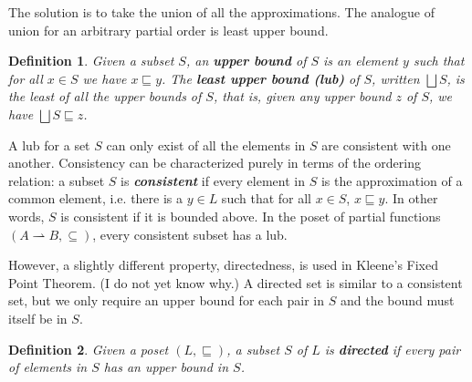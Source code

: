 \documentclass{tufte-handout}
\newtheorem{definition}{Definition}%
\begin{document}
The solution is to take the union of all the approximations. The
analogue of union for an arbitrary partial order is least upper bound.
%
%
\begin{definition}
Given a subset $S$, an \textbf{\emph{upper bound}} of $S$ is an element
$y$ such that for all $x \in S$ we have $x \sqsubseteq y$.  The
\textbf{\emph{least upper bound (lub)}} of $S$, written $\bigsqcup S$,
is the least of all the upper bounds of $S$, that is, given any upper
bound $z$ of $S$, we have $\bigsqcup S \sqsubseteq z$.
\end{definition}

A lub for a set $S$ can only exist of all the elements in $S$ are
consistent with one another.
%
%
Consistency can be characterized purely in terms of the ordering
relation: a subset $S$ is \textbf{\emph{consistent}} if every element
in $S$ is the approximation of a common element, i.e.  there is a $y
\in L$ such that for all $x \in S$, $x \sqsubseteq y$. In other words,
$S$ is consistent if it is bounded above.
%
In the poset of partial functions $(A \rightharpoonup B, \subseteq)$,
every consistent subset has a lub.

%

However, a slightly different property, directedness, is used in
Kleene's Fixed Point Theorem. (I do not yet know why.) A directed set
is similar to a consistent set, but we only require an upper bound for
each pair in $S$ and the bound must itself be in $S$.

\begin{definition}
  Given a poset $(L,\sqsubseteq)$, a subset $S$ of $L$ is
  \textbf{\emph{directed}} if every pair of elements in $S$ has an
  upper bound in $S$.
\end{definition}
\end{document}
